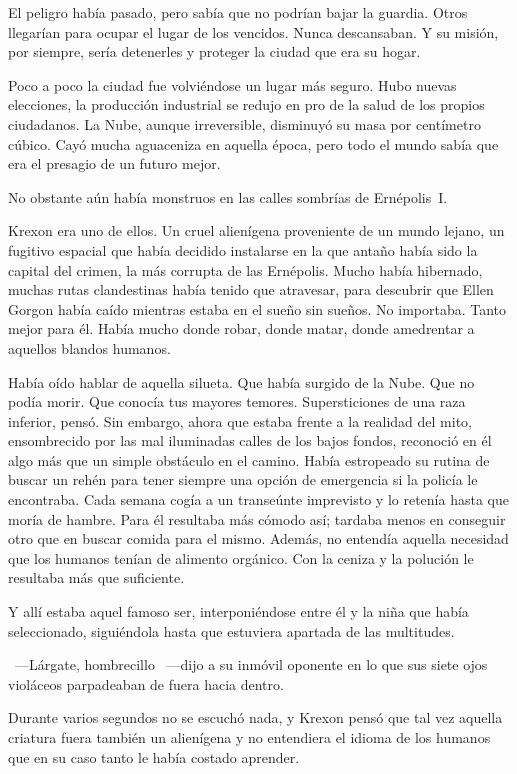 \noindent
El peligro había pasado, pero sabía que no podrían bajar la guardia. Otros llegarían para ocupar el lugar de los vencidos. Nunca descansaban. Y su misión, por siempre, sería detenerles y proteger la ciudad que era su hogar.

\parbreak\noindent
Poco a poco la ciudad fue volviéndose un lugar más seguro. Hubo nuevas elecciones, la producción industrial se redujo en pro de la salud de los propios ciudadanos. La Nube, aunque irreversible, disminuyó su masa por centímetro cúbico. Cayó mucha aguaceniza en aquella época, pero todo el mundo sabía que era el presagio de un futuro mejor.

No obstante aún había monstruos en las calles sombrías de Ernépolis~I.

Krexon era uno de ellos. Un cruel alienígena proveniente de un mundo lejano, un fugitivo espacial que había decidido instalarse en la que antaño había sido la capital del crimen, la más corrupta de las Ernépolis. Mucho había hibernado, muchas rutas clandestinas había tenido que atravesar, para descubrir que Ellen Gorgon había caído mientras estaba en el sueño sin sueños. No importaba. Tanto mejor para él. Había mucho donde robar, donde matar, donde amedrentar a aquellos blandos humanos.

Había oído hablar de aquella silueta. Que había surgido de la Nube. Que no podía morir. Que conocía tus mayores temores. Supersticiones de una raza inferior, pensó. Sin embargo, ahora que estaba frente a la realidad del mito, ensombrecido por las mal iluminadas calles de los bajos fondos, reconoció en él algo más que un simple obstáculo en el camino. Había estropeado su rutina de buscar un rehén para tener siempre una opción de emergencia si la policía le encontraba. Cada semana cogía a un transeúnte imprevisto y lo retenía hasta que moría de hambre. Para él resultaba más cómodo así; tardaba menos en conseguir otro que en buscar comida para el mismo. Además, no entendía aquella necesidad que los humanos tenían de alimento orgánico. Con la ceniza y la polución le resultaba más que suficiente.

Y allí estaba aquel famoso ser, interponiéndose entre él y la niña que había seleccionado, siguiéndola hasta que estuviera apartada de las multitudes.

~---Lárgate, hombrecillo ~---dijo a su inmóvil oponente en lo que sus siete ojos violáceos parpadeaban de fuera hacia dentro.

Durante varios segundos no se escuchó nada, y Krexon pensó que tal vez aquella criatura fuera también un alienígena y no entendiera el idioma de los humanos que en su caso tanto le había costado aprender.

